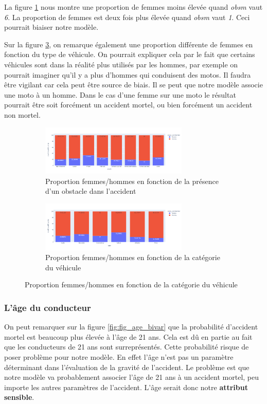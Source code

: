 \documentclass{article}
\begin{document}
    La figure \ref{fig:fig_sexe_bivar1} nous montre une proportion de femmes moins élevée quand \textit{obsm} vaut 
    \textit{6}. La proportion de femmes est deux fois plus élevée quand \textit{obsm} vaut \textit{1}. Ceci pourrait biaiser notre 
    modèle.
    
    Sur la figure \ref{fig:fig_sexe_bivar2}, on remarque également une proportion différente de femmes 
    en fonction du type de véhicule. On pourrait expliquer cela par le fait que certains véhicules sont 
    dans la réalité plus utilisés par les hommes, par exemple on pourrait imaginer qu'il y a plus d'hommes qui 
    conduisent des motos. Il faudra être vigilant car cela peut être source de biais. Il se peut que notre 
    modèle associe une moto à un homme. Dans le cas d'une femme sur une moto le résultat pourrait être soit
    forcément un accident mortel, ou bien forcément un accident non mortel.

    \begin{figure}[h]
        \centering
        \begin{subfigure}{7cm}
            \includegraphics[width=7cm]{./img/bivar_sexe.png}
            \caption{Proportion femmes/hommes en fonction de la présence d'un obstacle dans l'accident}\label{fig:fig_sexe_bivar1}
        \end{subfigure}
        \hspace{0.2cm}
        \begin{subfigure}{7cm}
            \includegraphics[width=7cm]{./img/bivar_sexe2.png}
        \caption{Proportion femmes/hommes en fonction de la catégorie du véhicule}\label{fig:fig_sexe_bivar2}
        \end{subfigure}
    \end{figure}
    \vspace{2cm}

    \subsubsection{L'âge du conducteur}
    On peut remarquer sur la figure \ref{fig:fig_age_bivar} que la probabilité d'accident mortel est beaucoup plus élevée à l'âge de 
    21 ans. Cela est dû en partie au fait que les conducteurs de 21 ans sont surreprésentés. Cette probabilité risque de poser 
    problème pour notre modèle. En effet l'âge n'est pas un paramètre déterminant dans l'évaluation de la gravité de l'accident. 
    Le problème est que notre modèle va probablement associer l'âge de 21 ans à un accident mortel, peu importe les autres paramètres 
    de l'accident. L'âge serait donc notre \textbf{attribut sensible}.
\end{document}
